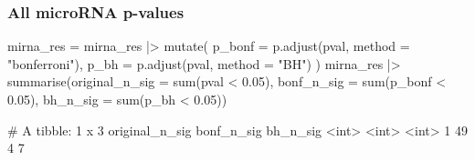 \documentclass[a4paper]{article}\usepackage[]{graphicx}\usepackage[]{xcolor}
\begin{document}
\subsubsection{All microRNA p-values}
\begin{Schunk}
\begin{Sinput}
mirna_res = mirna_res |> 
  mutate(
    p_bonf = p.adjust(pval, method = "bonferroni"),
    p_bh = p.adjust(pval, method = "BH")
  )
mirna_res |> 
  summarise(original_n_sig = sum(pval < 0.05),
            bonf_n_sig = sum(p_bonf < 0.05),
            bh_n_sig = sum(p_bh < 0.05))
\end{Sinput}
\begin{Soutput}
# A tibble: 1 x 3
  original_n_sig bonf_n_sig bh_n_sig
           <int>      <int>    <int>
1             49          4        7
\end{Soutput}
\end{Schunk}
\end{document}
